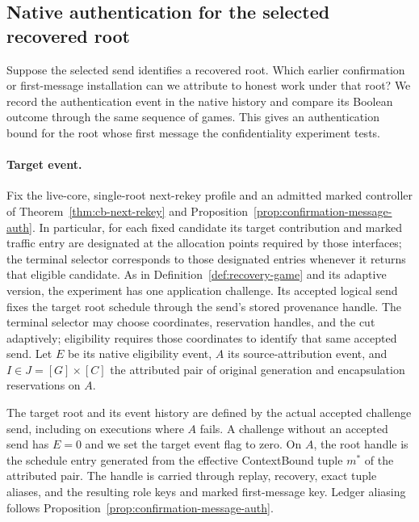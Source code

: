 \subsection{Native authentication for the selected recovered root}
\label{sec:native-authentication}

Suppose the selected send identifies a recovered root. Which earlier
confirmation or first-message installation can we attribute to honest
work under that root? We record the authentication event in the native
history and compare its Boolean outcome through the same sequence of
games. This gives an authentication bound for the root whose first
message the confidentiality experiment tests.

\paragraph{Target event.}
Fix the live-core, single-root next-rekey profile and an admitted marked
controller of Theorem~\ref{thm:cb-next-rekey} and
Proposition~\ref{prop:confirmation-message-auth}.  In particular, for each
fixed candidate its target contribution and marked traffic entry are
designated at the allocation points required by those interfaces; the
terminal selector corresponds to those designated entries whenever
it returns that eligible candidate.  As in
Definition~\ref{def:recovery-game} and its adaptive version, the experiment
has one application challenge.  Its accepted logical send fixes
the target root schedule through the send's stored provenance handle.  The
terminal selector may choose coordinates, reservation handles, and the cut
adaptively; eligibility requires those coordinates to identify that same
accepted send.  Let $E$ be its native eligibility event, $A$ its
source-attribution event, and $I\in J=[G]\times[C]$ the attributed pair of
original generation and encapsulation reservations on $A$.

The target root and its event history are defined by the actual accepted
challenge send, including on executions where $A$ fails.  A challenge without
an accepted send has $E=0$ and we set the target event flag to zero.  On $A$,
the root handle is the schedule entry generated from the effective
ContextBound tuple $m^*$ of the attributed pair.  The handle is carried
through replay, recovery, exact tuple aliases, and the resulting role keys
and marked first-message key.  Ledger aliasing follows
Proposition~\ref{prop:confirmation-message-auth}.

